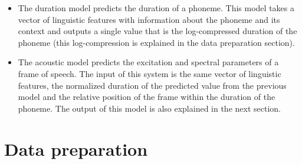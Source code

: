\begin{itemize}
    \item The duration model predicts the duration of a phoneme. This model takes a vector of linguistic features with information about the phoneme and its context and outputs a single value that is the log-compressed duration of the phoneme (this log-compression is explained in the data preparation section).
    \item The acoustic model predicts the excitation and spectral parameters of a frame of speech. The input of this system is the same vector of linguistic features, the normalized duration of the predicted value from the previous model and the relative position of the frame within the duration of the phoneme. The output of this model is also explained in the next section.
\end{itemize}




\section{Data preparation}


